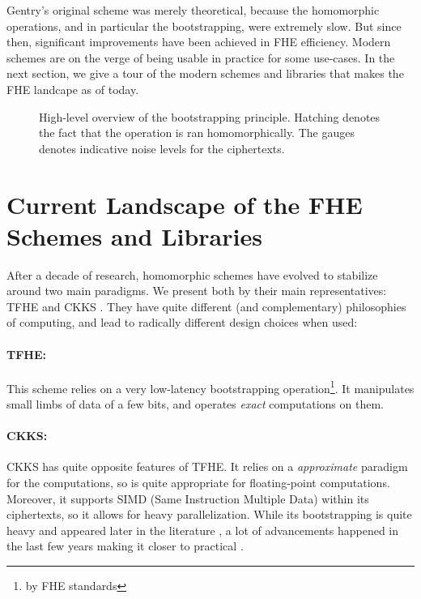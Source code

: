Gentry's original scheme was merely theoretical, because the homomorphic operations, and in particular the bootstrapping, were extremely slow. But since then, significant improvements have been achieved in \gls{FHE} efficiency. Modern schemes are on the verge of being usable in practice for some use-cases. In the next section, we give a tour of the modern schemes and libraries that makes the \gls{FHE} landcape as of today.



\begin{figure}
	\centering
	
	\caption{High-level overview of the bootstrapping principle. Hatching denotes the fact that the operation is ran homomorphically. The gauges denotes indicative noise levels for the ciphertexts.}
	\label{fig:bootstrapping_principle}
\end{figure}


\section{Current Landscape of the FHE Schemes and Libraries}
\label{sec:landscape}

After a decade of research, homomorphic schemes have evolved to stabilize around two main paradigms. We present both by their main representatives: \gls{TFHE} \cite{JC:CGGI20} and CKKS \cite{AC:CKKS17}. They have quite different (and complementary) philosophies of computing, and lead to radically different design choices when used:


\paragraph{\gls{TFHE}:} This scheme relies on a very low-latency bootstrapping operation\footnote{by \gls{FHE} standards}. It manipulates small limbs of data of a few bits, and operates \textit{exact} computations on them.


\paragraph{CKKS:} CKKS has quite opposite features of \gls{TFHE}. It relies on a \textit{approximate} paradigm for the computations, so is quite appropriate for floating-point computations. Moreover, it supports SIMD (Same Instruction Multiple Data) within its ciphertexts, so it allows for heavy parallelization. While its bootstrapping is quite heavy and appeared later in the literature \cite{EC:CHKKS18}, a lot of advancements happened in the last few years making it closer to practical \cite{EC:CheChiSon19, RSA:HanKi20, AC:KPKKM22}.


